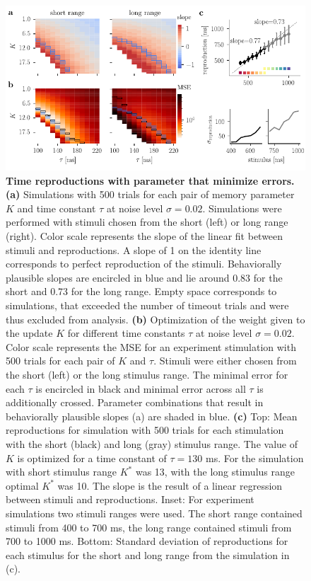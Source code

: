 \documentclass[10pt]{article}
\begin{document}
\begin{figure}[ht]
	\centering
	\includegraphics{figures/interIparams.pdf}
	\caption{\textbf{Time reproductions with parameter that minimize errors.} 
	\textbf{(a)} Simulations with 500 trials for each pair of memory parameter $K$ and time constant $\tau$ at noise level $\sigma = 0.02$. Simulations were performed with stimuli chosen from the short (left) or long range (right). Color scale represents the slope of the linear fit between stimuli and reproductions. A slope of 1 on the identity line corresponds to perfect reproduction of the stimuli. Behaviorally plausible slopes are encircled in blue and lie around 0.83 for the short and 0.73 for the long range. Empty space corresponds to simulations, that exceeded the number of timeout trials and were thus excluded from analysis.
	\textbf{(b)} Optimization of the weight given to the update $K$ for different time constants $\tau$ at noise level $\sigma = 0.02$. Color scale represents the MSE for an experiment stimulation with 500 trials for each pair of $K$ and $\tau$. Stimuli were either chosen from the short (left) or the long stimulus range. The minimal error for each $\tau$ is encircled in black and minimal error across all $\tau$ is additionally crossed. Parameter combinations that result in behaviorally plausible slopes (a) are shaded in blue.
	\textbf{(c)} Top: Mean reproductions for simulation with 500 trials for each stimulation with the short (black) and long (gray) stimulus range. The value of $K$ is optimized for a time constant of $\tau = 130$ ms. For the simulation with short stimulus range $K^*$ was 13, with the long stimulus range optimal $K^*$ was 10. 
		The slope is the result of a linear regression between stimuli and reproductions.
		Inset: For experiment simulations two stimuli ranges were used. The short range contained stimuli from 400 to 700 ms, the long range contained stimuli from 700 to 1000 ms.
		Bottom: Standard deviation of reproductions for each stimulus for the short and long range from the simulation in (c).
	}
\label{fig:parameter}
\end{figure}
\end{document}
